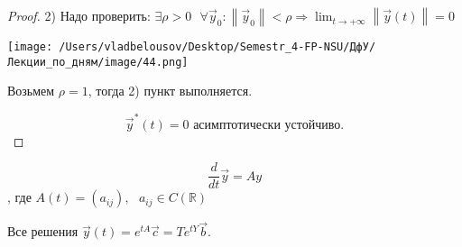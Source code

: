 \documentclass[12pt, a4paper]{report}
\begin{document}
\begin{proof}
    2) Надо проверить: \( \exists  \rho > 0 \text{ } \forall  \vec{y } _0 : \left\lVert \vec{y } _0  \right\rVert < \rho \Rightarrow \displaystyle \lim_{t \to +\infty} \left\lVert \vec{y } (t) \right\rVert = 0  \) 

    \begin{center}
        \texttt{[image: /Users/vladbelousov/Desktop/Semestr\_4-FP-NSU/ДфУ/Лекции\_по\_дням/image/44.png]}
    \end{center}


    Возьмем \( \rho = 1 \), тогда 2) пункт выполняется. 

    \[ \vec{ y } ^{* } (t )  = 0  \text{ асимптотически устойчиво.} \] 

\end{proof}

\[ \frac{d}{dt }  \vec{y } = A y \tag{2} \] 
, где \( \displaystyle  A (t ) = (a_{ij } ) , \text{ }  a_{ij } \in  C(\mathbb{R})  \)

Все решения \( \vec{y } (t) = e^{ t A }  \vec{ c }  = T e^{ t Y }  \vec{b} \).




\ifdefined\mainfile
\else
    
\end{document}
